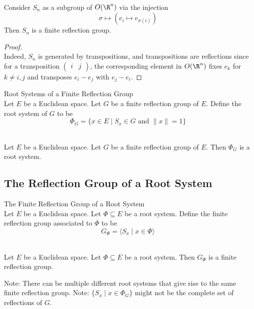 \documentclass[a4paper]{article}
\begin{document}
\begin{eg}{}{}\\
Consider $S_n$ as a subgroup of $O(\R^n)$ via the injection $$\sigma\mapsto(e_i\mapsto e_{\sigma(i)})$$ Then $S_n$ is a finite reflection group. 
\begin{proof}\\
Indeed, $S_n$ is generated by transpositions, and transpositions are reflections since for a transposition $\begin{pmatrix}i & j\end{pmatrix}$, the corresponding element in $O(\R^n)$ fixes $e_k$ for $k\neq i,j$ and transposes $e_i-e_j$ with $e_j-e_i$. 
\end{proof}
\end{eg}

\begin{defn}{Root Systems of a Finite Reflection Group}{}\\
Let $E$ be a Euclidean space. Let $G$ be a finite reflection group of $E$. Define the root system of $G$ to be $$\Phi_G=\{x\in E\;|\;S_x\in G\text{ and }\|x\|=1\}$$
\end{defn}

\begin{lmm}{}{}\\
Let $E$ be a Euclidean space. Let $G$ be a finite reflection group of $E$. Then $\Phi_G$ is a root system. 
\end{lmm}

\subsection{The Reflection Group of a Root System}
\begin{defn}{The Finite Reflection Group of a Root System}{}\\
Let $E$ be a Euclidean space. Let $\Phi\subseteq E$ be a root system. Define the finite reflection group associated to $\Phi$ to be $$G_\Phi=\langle S_x\;|\;x\in\Phi\rangle$$
\end{defn}

\begin{lmm}{}{}\\
Let $E$ be a Euclidean space. Let $\Phi\subseteq E$ be a root system. Then $G_\Phi$ is a finite reflection group. 
\end{lmm}

Note: There can be multiple different root systems that give rise to the same finite reflection group. 
Note: $\{S_x\;|\;x\in\Phi_G\}$ might not be the complete set of reflections of $G$. 
\end{document}
